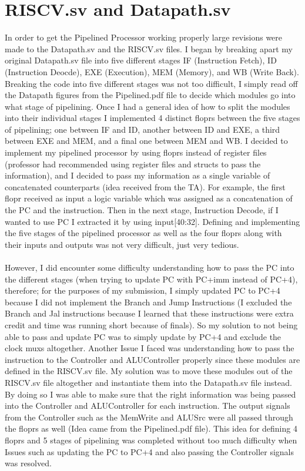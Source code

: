 \documentclass{article}
\begin{document}
\section{RISCV.sv and Datapath.sv}
In order to get the Pipelined Processor working properly large revisions were made to the Datapath.sv and the RISCV.sv files. I began by breaking apart my original Datapath.sv file into five different stages IF (Instruction Fetch), ID (Instruction Deocde), EXE (Execution), MEM (Memory), and WB (Write Back). Breaking the code into five different stages was not too difficult, I simply read off the Datapath figures from the Pipelined.pdf file to decide which modules go into what stage of pipelining. Once I had a general idea of how to split the modules into their individual stages I implemented 4 distinct floprs between the five stages of pipelining; one between IF and ID, another between ID and EXE, a third between EXE and MEM, and a final one between MEM and WB. I decided to implement my pipelined processor by using floprs instead of register files (professor had recommended using register files and structs to pass the information), and I decided to pass my information as a single variable of concatenated counterparts (idea received from the TA). For example, the first flopr received as input a logic variable which was assigned as a concatenation of the PC and the instruction. Then in the next stage, Instruction Decode, if I wanted to use PC I extracted it by using input[40:32]. Defining and implementing the five stages of the pipelined processor as well as the four floprs along with their inputs and outputs was not very difficult, just very tedious.\\\\
However, I did encounter some difficulty understanding how to pass the PC into the different stages (when trying to update PC with PC+imm instead of PC+4), therefore; for the purposes of my submission, I simply updated PC to PC+4 because I did not implement the Branch and Jump Instructions (I excluded the Branch and Jal instructions because I learned that these instructions were extra credit and time was running short because of finals). So my solution to not being able to pass and update PC was to simply update by PC+4 and exclude the clock muxs altogether. Another Issue I faced was understanding how to pass the instruction to the Controller and ALUController properly since these modules are defined in the RISCV.sv file. My solution was to move these modules out of the RISCV.sv file altogether and instantiate them into the Datapath.sv file instead. By doing so I was able to make sure that the right information was being passed into the Controller and ALUController for each instruction. The output signals from the Controller such as the MemWrite and ALUSrc were all passed through the floprs as well (Idea came from the Pipelined.pdf file). This idea for defining 4 floprs and 5 stages of pipelining was completed without too much difficulty when Issues such as updating the PC to PC+4 and also passing the Controller signals was resolved.\\\\
\end{document}
